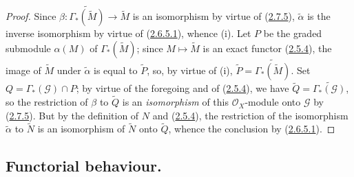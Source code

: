 \begin{proof}
Since $\beta:\widetilde{\Gamma_*(\widetilde{M})}
\to\widetilde{M}$ is an isomorphism by virtue of
(\hyperref[II.2.7.5]{2.7.5}), $\widetilde{\alpha}$ is the inverse
isomorphism by virtue of (\hyperref[II.2.6.5.1]{2.6.5.1}), whence (i). Let
$P$ be the graded submodule $\alpha(M)$ of $\Gamma_*(\widetilde{M})$; since
$M\mapsto\widetilde{M}$ is an exact functor
(\hyperref[II.2.5.4]{2.5.4}), the image of $\widetilde{M}$ under
$\widetilde{\alpha}$ is equal to $\widetilde{P}$, so, by virtue of (i),
$\widetilde{P}=\widetilde{\Gamma_*(\widetilde{M})}$. Set
$Q=\Gamma_*(\mathcal{G})\cap P$; by virtue of the foregoing and of
(\hyperref[II.2.5.4]{2.5.4}), we have
$\widetilde{Q}=\widetilde{\Gamma_*(\mathcal{G})}$, so the restriction of
$\beta$ to $\widetilde{Q}$ is an \emph{isomorphism} of this
$\mathcal{O}_X$-module onto $\mathcal{G}$ by
(\hyperref[II.2.7.5]{2.7.5}). But by the definition of $N$ and
(\hyperref[II.2.5.4]{2.5.4}), the restriction of the isomorphism
$\widetilde{\alpha}$ to $\widetilde{N}$ is an isomorphism of $\widetilde{N}$
onto $\widetilde{Q}$, whence the conclusion by
(\hyperref[II.2.6.5.1]{2.6.5.1}).
\end{proof}

\subsection{Functorial behaviour.}
\label{subsection:II.2.8}

